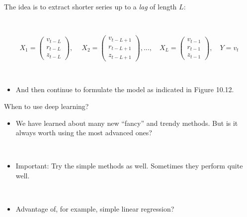 \documentclass[
  10pt,
  ignorenonframetext,
]{beamer}
\providecommand{\tightlist}{%
  \setlength{\itemsep}{0pt}\setlength{\parskip}{0pt}}
\begin{document}
\begin{frame}
The idea is to extract shorter series up to a \emph{lag} of length
\(L\):

\(~\)

\[X_1 = \left( 
\begin{matrix}
v_{t-L}\\
r_{t-L}\\
z_{t-L}
\end{matrix}
\right), \ 
\quad X_2 = \left( 
\begin{matrix}
v_{t-L+1}\\
r_{t-L+1}\\
z_{t-L+1}
\end{matrix}
\right), ... ,
\quad 
X_L = \left( 
\begin{matrix}
v_{t-1}\\
r_{t-1}\\
z_{t-1}
\end{matrix}
\right), 
\quad 
Y = v_t\]

\(~\)

\begin{itemize}
\tightlist
\item
  And then continue to formulate the model as indicated in Figure 10.12.
\end{itemize}
\end{frame}

\begin{frame}{When to use deep learning?}
\protect\hypertarget{when-to-use-deep-learning}{}
\(~\)

\begin{itemize}
\tightlist
\item
  We have learned about many new ``fancy'' and trendy methods. But is it
  always worth using the most advanced ones?
\end{itemize}

\(~\)

\begin{itemize}
\tightlist
\item
  Important: Try the simple methods as well. Sometimes they perform
  quite well.
\end{itemize}

\(~\)

\begin{itemize}
\tightlist
\item
  Advantage of, for example, simple linear regression?
\end{itemize}
\end{frame}
\end{document}
